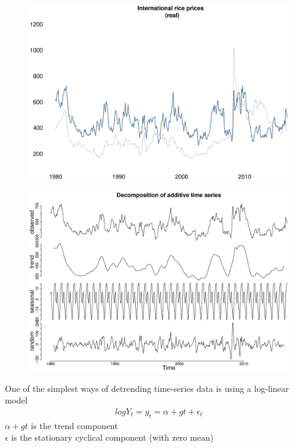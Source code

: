 \documentclass{beamer}
\begin{document}
\begin{frame}
  \begin{figure}
    \includegraphics[scale=.3]{rice2.eps}
  \end{figure}
\end{frame}

\begin{frame}
  \begin{figure}
    \includegraphics[scale=.3]{rice3.eps}
  \end{figure}
\end{frame}

\begin{frame}
  One of the simplest ways of detrending time-series data is using a log-linear model
  \begin{align}
    log Y_t = y_t = \alpha +gt + \epsilon_t
  \end{align}
  \medskip
  $\alpha+gt$ is the trend component\\
  $\epsilon$ is the stationary cyclical component (with zero mean)
\end{frame}
\end{document}
